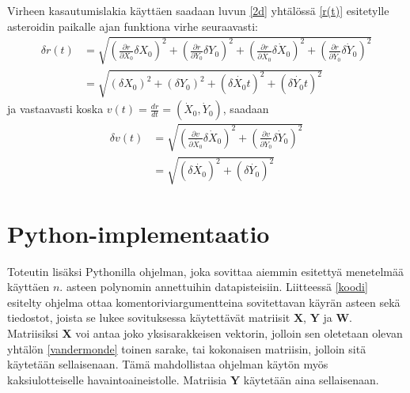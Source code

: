 \documentclass[12pt,a4paper,titlepage]{article}
\newcommand{\matr}[1]{\bm{#1}}
\begin{document}
Virheen kasautumislakia käyttäen saadaan luvun \ref{2d} yhtälössä \ref{r(t)} esitetylle asteroidin paikalle ajan funktiona virhe seuraavasti:
\begin{align}
	\delta r(t) &= \sqrt{\left(\frac{\partial r}{\partial{X_0}} \delta X_0 \right)^2 + \left(\frac{\partial r}{\partial{Y_0}} \delta Y_0 \right)^2 + \left(\frac{\partial r}{\partial\dot{X_0}} \delta \dot X_0 \right)^2 + \left(\frac{\partial r}{\partial\dot{Y_0}} \delta \dot Y_0 \right)^2 } \nonumber\\
	 &= \sqrt{ \left(\delta{X_0}\right)^2 + \left(\delta{Y_0}\right)^2 + \left(\delta\dot{X_0}t\right)^2 + \left(\delta\dot{Y_0}t\right)^2}
\end{align}
ja vastaavasti koska $v(t) = \frac{dr}{dt} = (\dot X_0, \dot Y_0)$, saadaan
\begin{align}
	\delta v(t) &= \sqrt{\left(\frac{\partial v}{\partial\dot{X_0}} \delta \dot X_0 \right)^2 + \left(\frac{\partial v}{\partial\dot{Y_0}} \delta \dot Y_0 \right)^2 } \nonumber\\
	 &= \sqrt{ \left(\delta\dot{X_0}\right)^2 + \left(\delta\dot{Y_0}\right)^2}
\end{align}

\section{Python-implementaatio}
Toteutin lisäksi Pythonilla ohjelman, joka sovittaa aiemmin esitettyä menetelmää käyttäen $n$. asteen polynomin annettuihin datapisteisiin. Liitteessä \ref{koodi} esitelty ohjelma ottaa komentoriviargumentteina sovitettavan käyrän asteen sekä tiedostot, joista se lukee sovituksessa käytettävät matriisit $\matr{X}$, $\matr{Y}$ ja $\matr{W}$. Matriisiksi $\matr{X}$ voi antaa joko yksisarakkeisen vektorin, jolloin sen oletetaan olevan yhtälön \ref{vandermonde} toinen sarake, tai kokonaisen matriisin, jolloin sitä käytetään sellaisenaan. Tämä mahdollistaa ohjelman käytön myös kaksiulotteiselle havaintoaineistolle. Matriisia $\matr{Y}$ käytetään aina sellaisenaan.
\end{document}
